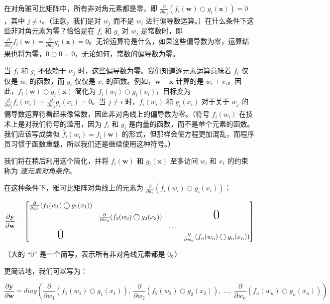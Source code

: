 \documentclass[lang=cn,newtx,10pt,scheme=chinese]{elegantbook}
\begin{document}
在对角雅可比矩阵中，所有非对角元素都是零，即 $\frac{\partial}{\partial w_j} ( f_i(\mathbf{w}) \bigcirc g_i(\mathbf{x}) ) = 0$，其中 $j \neq i$。（注意，我们是对 $w_j$ 而不是 $w_i$ 进行偏导数运算。）在什么条件下这些非对角元素为零？恰恰是在 $f_i$ 和 $g_i$ 对 $w_j$ 是常数时，即 $\frac{\partial}{\partial w_j} f_i(\mathbf{w}) = \frac{\partial}{\partial w_j} g_i(\mathbf{x}) = 0$。无论运算符是什么，如果这些偏导数为零，运算结果也将为零，$0 \bigcirc 0 = 0$，无论如何，常数的偏导数为零。

当 $f_i$ 和 $g_i$ 不依赖于 $w_j$ 时，这些偏导数为零。我们知道逐元素运算意味着 $f_i$ 仅仅是 $w_i$ 的函数，而 $g_i$ 仅仅是 $x_i$ 的函数。例如，$\mathbf{w}+\mathbf{x}$ 计算的是 $w_i + x_i$。因此，$f_i(\mathbf{w}) \bigcirc g_i(\mathbf{x})$ 简化为 $f_i(w_i) \bigcirc g_i(x_i)$，目标变为 $\frac{\partial}{\partial w_j} f_i(w_i) = \frac{\partial}{\partial w_j} g_i(x_i) = 0$。当 $j \neq i$ 时，$f_i(w_i)$ 和 $g_i(x_i)$ 对于关于 $w_j$ 的偏导数运算符看起来像常数，因此非对角线上的偏导数为零。（符号 $f_i(w_i)$ 在技术上是对我们符号的滥用，因为 $f_i$ 和 $g_i$ 是向量的函数，而不是单个元素的函数。我们应该写成类似 $\hat f_{i}(w_i) = f_{i}(\mathbf{w})$ 的形式，但那样会使方程更加混乱，而程序员习惯于函数重载，所以我们还是继续使用这种符号。）

我们将在稍后利用这个简化，并将 $f_i(\mathbf{w})$ 和 $g_i(\mathbf{x})$ 至多访问 $w_i$ 和 $x_i$ 的约束称为 {\em 逐元素对角条件}。

在这种条件下，雅可比矩阵对角线上的元素为 $\frac{\partial}{\partial w_i} ( f_i(w_i) \bigcirc g_i(x_i) )$：

\[\frac{\partial \mathbf{y}}{\partial \mathbf{w}}  = \begin{bmatrix}
\frac{\partial}{\partial w_1} ( f_{1}(w_1) \bigcirc g_{1}(x_1) )\\
& \frac{\partial}{\partial w_2} (f_{2}(w_2) \bigcirc g_{2}(x_2) ) & & \text{\huge0}\\
& & \ldots \\
\text{\huge0}& & & \frac{\partial}{\partial w_n} (f_{n}(w_n) \bigcirc g_{n}(x_n) )
\end{bmatrix}\]

（大的 ``0'' 是一个简写，表示所有非对角线元素都是 0。）

更简洁地，我们可以写为：

\[\frac{\partial \mathbf{y}}{\partial \mathbf{w}} = diag \left( \frac{\partial}{\partial w_1}(f_{1}(w_1) \bigcirc g_{1}(x_1)),~ \frac{\partial}{\partial w_2}(f_{2}(w_2) \bigcirc g_{2}(x_2)),~ \ldots,~ \frac{\partial}{\partial w_n}(f_{n}(w_n) \bigcirc g_{n}(x_n)) \right)\]
\end{document}
